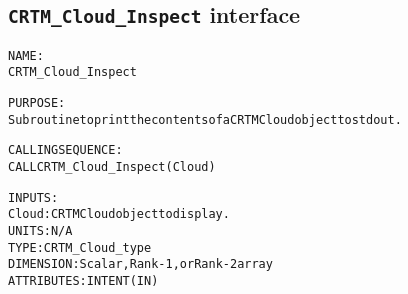 \subsection{\texttt{CRTM\_Cloud\_Inspect} interface}
  \label{sec:CRTM_Cloud_Inspect_interface}
  \begin{alltt}
 
  NAME:
        CRTM_Cloud_Inspect
 
  PURPOSE:
        Subroutine to print the contents of a CRTM Cloud object to stdout.
 
  CALLING SEQUENCE:
        CALL CRTM_Cloud_Inspect( Cloud )
 
  INPUTS:
        Cloud:         CRTM Cloud object to display.
                       UNITS:      N/A
                       TYPE:       CRTM_Cloud_type
                       DIMENSION:  Scalar, Rank-1, or Rank-2 array
                       ATTRIBUTES: INTENT(IN)
 
  \end{alltt}
